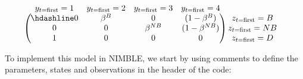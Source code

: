 \documentclass[
  12pt,
]{krantz}
\begin{document}
\[\begin{matrix}
& \\
    \left ( \vphantom{ \begin{matrix} 12 \\ 12 \\ 12\end{matrix} } \right .
\end{matrix}
\hspace{-1.2em}
\begin{matrix}
    y_{t = \text{first}}=1 & y_{t = \text{first}}=2 & y_{t = \text{first}}=3 & y_{t = \text{first}}=4\\ \hdashline
 0 & \beta^B & 0 & (1-\beta^B)\\
0 & 0 & \beta^{NB} & (1-\beta^{NB})\\
1 & 0 & 0 & 0
\end{matrix}
\hspace{-0.2em}
\begin{matrix}
& \\
\left . \vphantom{ \begin{matrix} 12 \\ 12 \\ 12\end{matrix} } \right )
    \begin{matrix}
    z_{t = \text{first}}=B \\ z_{t = \text{first}}=NB \\ z_{t = \text{first}}=D
    \end{matrix}
\end{matrix}\]

To implement this model in NIMBLE, we start by using comments to define the parameters, states and observations in the header of the code:
\end{document}
